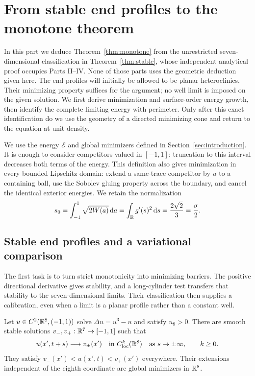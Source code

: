 \section{From stable end profiles to the monotone theorem}
\label{sec:monotone}

In this part we deduce Theorem~\ref{thm:monotone} from the unrestricted
seven-dimensional classification in Theorem~\ref{thm:stable}, whose
independent analytical proof occupies Parts II--IV.  None of those parts
uses the geometric deduction given here.  The end
profiles will initially be allowed to be planar heteroclinics.  Their
minimizing property suffices for the argument; no well limit is imposed on
the given solution.  We first derive minimization and surface-order energy
growth, then identify the complete limiting energy with perimeter.  Only
after this exact identification do we use the geometry of a directed
minimizing cone and return to the equation at unit density.

We use the energy $\mathcal E$ and global minimizers defined in
Section~\ref{sec:introduction}.  It is enough to consider
competitors valued in $[-1,1]$: truncation to this interval decreases both
terms of the energy.  This definition also gives minimization in every
bounded Lipschitz domain: extend a same-trace competitor by $u$ to a
containing ball, use the Sobolev gluing property across the boundary, and
cancel the identical exterior energies.  We retain the normalization
\begin{equation}
 s_0=\int_{-1}^1\sqrt{2W(a)}\,\mathrm d a
     =\int_\mathbb R g'(s)^2\,\mathrm d s
     =\frac{2\sqrt2}{3}=\frac\sigma2.
 \label{eq:monotone-tension}
\end{equation}

\subsection{Stable end profiles and a variational comparison}

The first task is to turn strict monotonicity into minimizing barriers.
The positive directional derivative gives stability, and a long-cylinder
test transfers that stability to the seven-dimensional limits.  Their
classification then supplies a calibration, even when a limit is a planar
profile rather than a constant well.

\begin{lemma}
\label{lem:monotone-ends}
Let $u\in C^2(\mathbb R^8,(-1,1))$ solve $\Delta u=u^3-u$ and satisfy
$u_8>0$.  There are smooth stable solutions
$v_-,v_+:\mathbb R^7\to[-1,1]$ such that
\begin{equation}
 u(x',t+s)\longrightarrow v_\pm(x')
 \quad\text{in }C^k_{\mathrm{loc}}(\mathbb R^8)
 \quad\text{as }s\to\pm\infty,
 \qquad k\ge0.
 \label{eq:monotone-end-convergence}
\end{equation}
They satisfy $v_-(x')<u(x',t)<v_+(x')$ everywhere.  Their extensions
independent of the eighth coordinate are global minimizers in $\mathbb R^8$.
\end{lemma}

